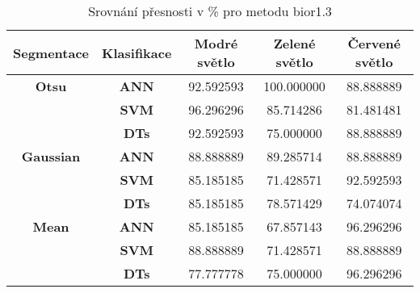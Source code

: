 \capstartfalse
\begin{table}[!htbp]
\centering
\begin{tabular}{|c|c|c|c|c|}
\hline
\textbf{Segmentace} & \textbf{Klasifikace} & \textbf{Modré světlo} & \textbf{Zelené světlo} & \textbf{Červené světlo} \\ \hline
\textbf{Otsu}       & \textbf{ANN}         & 92.592593             & 100.000000             & 88.888889               \\ \hline
\textbf{}           & \textbf{SVM}         & 96.296296             & 85.714286              & 81.481481               \\ \hline
\textbf{}           & \textbf{DTs}         & 92.592593             & 75.000000              & 88.888889               \\ \hline
\textbf{Gaussian}   & \textbf{ANN}         & 88.888889             & 89.285714              & 88.888889               \\ \hline
\textbf{}           & \textbf{SVM}         & 85.185185             & 71.428571              & 92.592593               \\ \hline
\textbf{}           & \textbf{DTs}         & 85.185185             & 78.571429              & 74.074074               \\ \hline
\textbf{Mean}       & \textbf{ANN}         & 85.185185             & 67.857143              & 96.296296               \\ \hline
\textbf{}           & \textbf{SVM}         & 88.888889             & 71.428571              & 88.888889               \\ \hline
\textbf{}           & \textbf{DTs}         & 77.777778             & 75.000000              & 96.296296               \\ \hline
\end{tabular}
\caption{Srovnání přesnosti v \% pro metodu bior1.3 }
\end{table}
\capstarttrue


